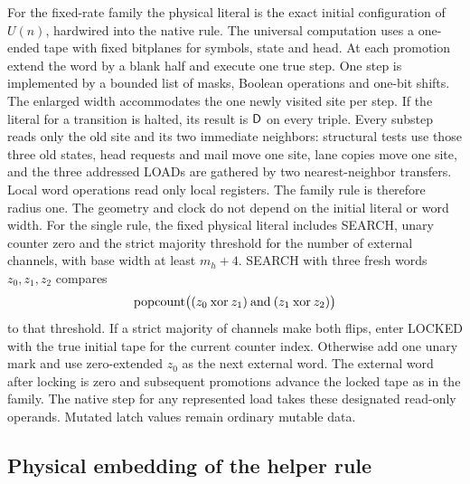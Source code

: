 For the fixed-rate family the physical literal is the exact initial configuration of \(U(n)\), hardwired into the native rule. The universal computation uses a one-ended tape with fixed bitplanes for symbols, state and head. At each promotion extend the word by a blank half and execute one true step. One step is implemented by a bounded list of masks, Boolean operations and one-bit shifts. The enlarged width accommodates the one newly visited site per step. If the literal for a transition is halted, its result is \(\mathsf D\) on every triple. Every substep reads only the old site and its two immediate neighbors: structural tests use those three old states, head requests and mail move one site, lane copies move one site, and the three addressed LOADs are gathered by two nearest-neighbor transfers. Local word operations read only local registers. The family rule is therefore radius one. The geometry and clock do not depend on the initial literal or word width. For the single rule, the fixed physical literal includes SEARCH, unary counter zero and the strict majority threshold for the number of external channels, with base width at least \(m_h+4\). SEARCH with three fresh words \(z_0,z_1,z_2\) compares
\[
\operatorname{popcount}\bigl((z_0\mathbin{\mathrm{xor}}z_1)\mathbin{\mathrm{and}}
                   (z_1\mathbin{\mathrm{xor}}z_2)\bigr)
\]
to that threshold. If a strict majority of channels make both flips, enter LOCKED with the true initial tape for the current counter index. Otherwise add one unary mark and use zero-extended \(z_0\) as the next external word. The external word after locking is zero and subsequent promotions advance the locked tape as in the family. The native step for any represented load takes these designated read-only operands. Mutated latch values remain ordinary mutable data.

\subsection{Physical embedding of the helper rule}\label{sec:embedding}


